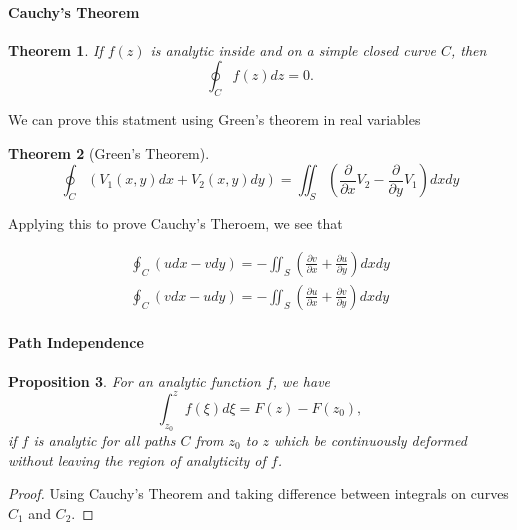 \documentclass[12pt]{article}
\newcommand{\pdiff}[2]{\frac{\partial #1}{\partial #2}}
\newtheorem{thm}{Theorem}[section]
\newtheorem{prop}[thm]{Proposition}
\theoremstyle{definition}
\theoremstyle{remark}
\numberwithin{equation}{section}
\begin{document}
\paragraph{Cauchy's  Theorem}%
\label{par:cauchys_theorem}

\begin{thm}
  If $f(z)$ is analytic inside and on a simple closed curve $C$, then 
  \begin{equation}
    \oint_C f(z) dz = 0.
  \end{equation}
\end{thm}

We can prove this statment using Green's theorem in real variables

\begin{thm}[Green's Theorem]
\begin{equation}
  \oint_C (V_1(x,y)dx + V_2(x,y)dy) = \iint_S \left(\pdiff{}{x}V_2 - \pdiff{}{y}V_1\right)dxdy
\end{equation}
\end{thm}



Applying this to prove Cauchy's  Theroem, we see that 

\begin{align}
  \oint_C (u dx - vdy) = - \iint_S \left( \pdiff{v}{x} + \pdiff{u}{y}\right) dxdy \\
  \oint_C (v dx - udy) = - \iint_S \left( \pdiff{u}{x} + \pdiff{v}{y}\right) dxdy 
\end{align}

\paragraph{Path Independence}%
\label{par:path_independence}

\begin{prop}
For an analytic function $f$, we have
\begin{equation}
  \int_{z_0}^{z} f(\xi) d\xi = F(z) - F(z_0),
\end{equation}
if $f$ is analytic for all paths $C$ from $z_0$ to $z$ which be continuously deformed without leaving the region of analyticity of $f$. 
\end{prop}
\begin{proof}
  Using Cauchy's Theorem and taking difference between integrals on curves $C_1$ and $C_2$.
\end{proof}
\end{document}
